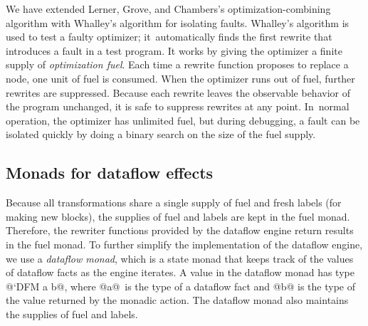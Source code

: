 \documentclass[blockstyle,preprint,natbib,nocopyrightspace]{sigplanconf}
\newcommand\seclabel[1]{\label{sec:#1}}
\begin{document}
\seclabel{vpoiso}
\seclabel{fuel}

We have extended Lerner, Grove, and Chambers's optimization-combining algorithm with
Whalley's \citeyearpar{whalley:isolation} algorithm for isolating
faults.
Whalley's algorithm is used to test a faulty optimizer;
it~automatically
finds the first rewrite that introduces a fault in a test program.
It works by giving the optimizer a finite supply of \emph{optimization fuel}.
Each time a rewrite function proposes to replace a node, one unit of fuel is
consumed.
When the optimizer runs out of fuel, further rewrites are suppressed.
Because each rewrite leaves the observable behavior of the
program unchanged, it is safe to suppress rewrites at
any point.
In~normal operation, the optimizer has unlimited fuel, but during
debugging, a fault can be isolated quickly by doing a binary search on
the size of the fuel supply.


\subsection{Monads for dataflow effects}

Because all transformations share a single
supply of fuel and fresh labels (for making new blocks),
the supplies of fuel and labels are kept
in the fuel monad.
Therefore, the rewriter functions provided by the dataflow engine
return results in the fuel monad.
To further simplify the implementation of the dataflow engine,
we use a \emph{dataflow monad}, which is a state monad
that keeps track of the values of dataflow facts as the engine iterates.
A value in the dataflow monad has type @`DFM a b@, where @a@~is the type of a
dataflow fact and @b@ is the type of the value returned by the monadic action.
The dataflow monad also maintains the supplies of fuel
and labels.
\end{document}
